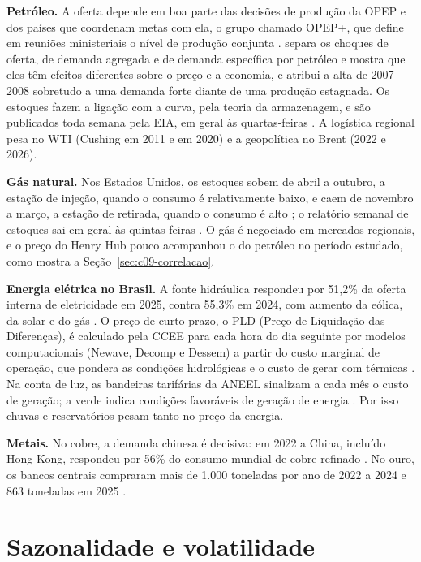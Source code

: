 \textbf{Petróleo.} A oferta depende em boa parte das decisões de produção da OPEP e dos países que coordenam metas com ela, o grupo chamado OPEP+, que define em reuniões ministeriais o nível de produção conjunta \citep{opec2025}. \citet{kilian2009} separa os choques de oferta, de demanda agregada e de demanda específica por petróleo e mostra que eles têm efeitos diferentes sobre o preço e a economia, e \citet{hamilton2009} atribui a alta de 2007--2008 sobretudo a uma demanda forte diante de uma produção estagnada. Os estoques fazem a ligação com a curva, pela teoria da armazenagem, e são publicados toda semana pela EIA, em geral às quartas-feiras \citep{eia2026agenda}. A logística regional pesa no WTI (Cushing em 2011 e em 2020) e a geopolítica no Brent (2022 e 2026).

\textbf{Gás natural.} Nos Estados Unidos, os estoques sobem de abril a outubro, a estação de injeção, quando o consumo é relativamente baixo, e caem de novembro a março, a estação de retirada, quando o consumo é alto \citep{eia2024}; o relatório semanal de estoques sai em geral às quintas-feiras \citep{eia2026agenda}. O gás é negociado em mercados regionais, e o preço do Henry Hub pouco acompanhou o do petróleo no período estudado, como mostra a Seção~\ref{sec:c09-correlacao}.

\textbf{Energia elétrica no Brasil.} A fonte hidráulica respondeu por 51,2\% da oferta interna de eletricidade em 2025, contra 55,3\% em 2024, com aumento da eólica, da solar e do gás \citep{epe2026}. O preço de curto prazo, o PLD (Preço de Liquidação das Diferenças), é calculado pela CCEE para cada hora do dia seguinte por modelos computacionais (Newave, Decomp e Dessem) a partir do custo marginal de operação, que pondera as condições hidrológicas e o custo de gerar com térmicas \citep{ccee2026}. Na conta de luz, as bandeiras tarifárias da ANEEL sinalizam a cada mês o custo de geração; a verde indica condições favoráveis de geração de energia \citep{aneel2026}. Por isso chuvas e reservatórios pesam tanto no preço da energia.

\textbf{Metais.} No cobre, a demanda chinesa é decisiva: em 2022 a China, incluído Hong Kong, respondeu por 56\% do consumo mundial de cobre refinado \citep{usgs2026}. No ouro, os bancos centrais compraram mais de 1.000 toneladas por ano de 2022 a 2024 e 863 toneladas em 2025 \citep{wgc2026}.

\section{Sazonalidade e volatilidade}
\label{sec:c09-sazonalidade}

